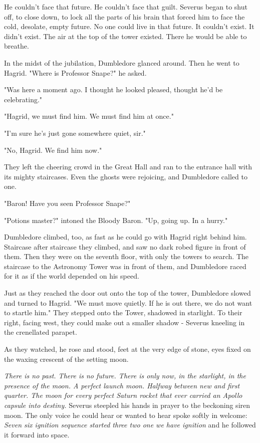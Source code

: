 He couldn't face that future. He couldn't face that guilt. Severus began to shut off, to close down, to lock all the parts of his brain that forced him to face the cold, desolate, empty future. No one could live in that future. It couldn't exist. It didn't exist. The air at the top of the tower existed. There he would be able to breathe.

In the midst of the jubilation, Dumbledore glanced around. Then he went to Hagrid. "Where is Professor Snape?" he asked.

"Was here a moment ago. I thought he looked pleased, thought he'd be celebrating."

"Hagrid, we must find him. We must find him at once."

"I'm sure he's just gone somewhere quiet, sir."

"No, Hagrid. We find him now."

They left the cheering crowd in the Great Hall and ran to the entrance hall with its mighty staircases. Even the ghosts were rejoicing, and Dumbledore called to one.

"Baron! Have you seen Professor Snape?"

"Potions master?" intoned the Bloody Baron. "Up, going up. In a hurry."

Dumbledore climbed, too, as fast as he could go with Hagrid right behind him. Staircase after staircase they climbed, and saw no dark robed figure in front of them. Then they were on the seventh floor, with only the towers to search. The staircase to the Astronomy Tower was in front of them, and Dumbledore raced for it as if the world depended on his speed.

Just as they reached the door out onto the top of the tower, Dumbledore slowed and turned to Hagrid. "We must move quietly. If he is out there, we do not want to startle him." They stepped onto the Tower, shadowed in starlight. To their right, facing west, they could make out a smaller shadow - Severus kneeling in the crenellated parapet.

As they watched, he rose and stood, feet at the very edge of stone, eyes fixed on the waxing crescent of the setting moon.

\emph{There is no past. There is no future. There is only now, in the starlight, in the presence of the moon. A perfect launch moon. Halfway between new and first quarter. The moon for every perfect Saturn rocket that ever carried an Apollo capsule into destiny.} Severus steepled his hands in prayer to the beckoning siren moon. The only voice he could hear or wanted to hear spoke softly in welcome: \emph{Seven{\el} six{\el} ignition sequence started{\el} three{\el} two{\el} one{\el} we have ignition{\el}} and he followed it forward into space.

